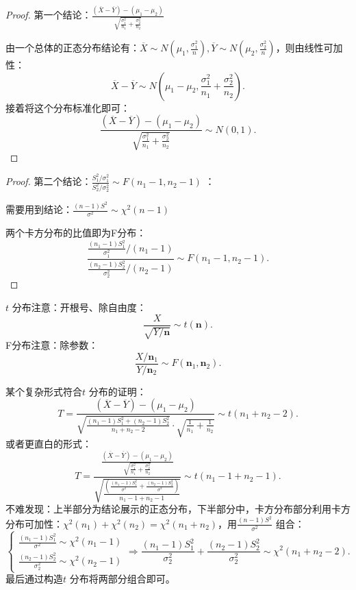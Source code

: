 \begin{proof}
    第一个结论：$\frac{\left( \overline{X}-\overline{Y} \right)-\left( \mu_1-\mu_2 \right)}{\sqrt{\frac{\sigma_1^2}{n_1}+\frac{\sigma_2^2 }{n_2} }}$
    
    由一个总体的正态分布结论有：$\overline{X}\sim N\left( \mu_1,\frac{\sigma_1^2}{n} \right),\overline{Y}\sim N\left( \mu_2,\frac{\sigma_2^2}{n} \right)$，则由线性可加性：\[
        \overline{X}-\overline{Y}\sim N\left( \mu_1-\mu_2,\frac{\sigma_1^2 }{n_1}+\frac{\sigma_2^2 }{n_2} \right)
    .\]
    接着将这个分布标准化即可：\[
        \frac{\left( \overline{X}-\overline{Y} \right)-\left( \mu_1-\mu_2 \right)}{\sqrt{\frac{\sigma_1^2 }{n_1}+\frac{\sigma_2^2 }{n_2}}} \sim N\left( 0,1 \right)
    .\]
\end{proof}
\begin{proof}
    第二个结论：$\frac{S_1^2 /\sigma_1^2 }{S_2^2 /\sigma_2^2 }\sim F\left( n_1-1,n_2-1 \right)$ ：

    需要用到结论：$\frac{\left( n-1 \right)S^2 }{\sigma^2 }\sim \chi^2 \left( n-1 \right)$ 

    两个卡方分布的比值即为F分布：\[
        \frac{\frac{\left( n_1-1 \right)S_1^2 }{\sigma_1^2 } /\left( n_1-1 \right)}{\frac{\left( n_2-1 \right)S_2^2 }{\sigma_2^2 } /\left( n_2-1 \right)}\sim F\left( n_1-1,n_2-1 \right)
    .\]
\end{proof}
\begin{notation}
    $t$ 分布注意：开根号、除自由度：\[
        \frac{X}{\sqrt{Y /\bm{n}}}\sim t\left( \bm{n} \right)
    .\]
    F分布注意：除参数：\[
        \frac{X /\bm{n}_1}{Y /\bm{n}_2}\sim F\left( \bm{n}_1,\bm{n}_2 \right)
    .\]
\end{notation}
\begin{notation}
    某个复杂形式符合$t$ 分布的证明：\[
        T=\frac{\left( \overline{X}-\overline{Y} \right)-\left( \mu_1-\mu_2 \right)}{\sqrt{\frac{\left( n_1-1 \right)S_1^2 +\left( n_2-1 \right)S_2^2 }{n_1+n_2-2}}\cdot \sqrt{\frac{1}{n_1}+\frac{1}{n_2}}}\sim t\left( n_1+n_2-2 \right)
    .\]
    或者更直白的形式：\[
        T=\frac{\frac{\left( \overline{X}-\overline{Y} \right)-\left( \mu_1-\mu_2 \right)}{\sqrt{\frac{\sigma_1^2}{n_1}+\frac{\sigma_2^2}{n_2}}}}{\sqrt{\frac{\left( \frac{\left( n_1-1 \right)S_1^2}{\sigma^2 } +\frac{\left( n_2-1 \right)S_2^2 }{\sigma^2 } \right)}{n_1-1+n_2-1}}} \sim t\left( n_1-1+n_2-1 \right)
    .\]
    不难发现：上半部分为结论展示的正态分布，下半部分中，卡方分布部分利用卡方分布可加性：$\chi^2 \left( n_1 \right)+\chi^2 \left( n_2 \right)=\chi^2 \left( n_1+n_2 \right)$，用$\frac{\left( n-1 \right)S^2 }{\sigma^2 }$ 组合：\[
        \begin{cases}
            \frac{\left( n_1-1 \right)S_1^2 }{\sigma^2 }\sim \chi^2 \left( n_1-1 \right)\\
            \frac{\left( n_2-1 \right)S_2^2 }{\sigma_2^2 }\sim \chi^2 \left( n_2-1 \right)
        \end{cases}\Rightarrow \frac{\left( n_1-1 \right)S_1^2 }{\sigma_2^2 }+\frac{\left( n_2-1 \right)S_2^2 }{\sigma_2^2 }\sim \chi^2 \left( n_1+n_2-2 \right)
    .\]
    最后通过构造$t$ 分布将两部分组合即可。
\end{notation}
